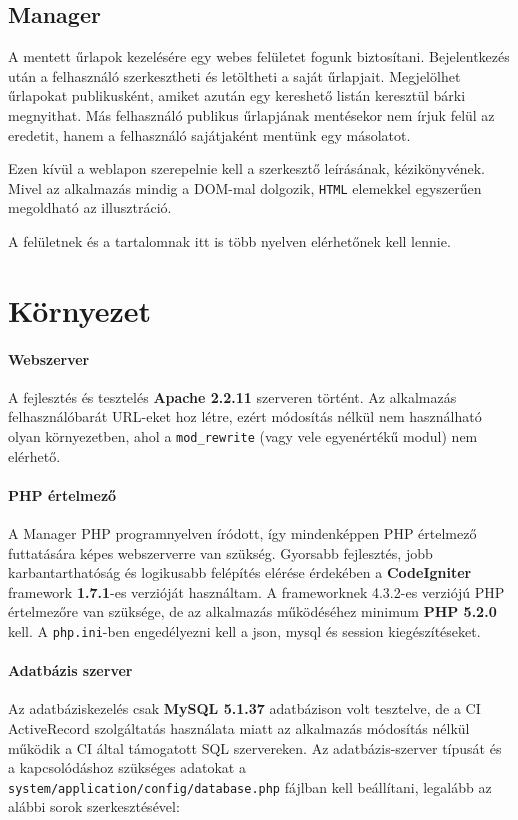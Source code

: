 \documentclass[12pt,a4paper,twoside]{article}
\begin{document}
\subsection{Manager}

A mentett űrlapok kezelésére egy webes felületet fogunk
biztosítani. Bejelentkezés után a felhasználó szerkesztheti és letöltheti a
saját űrlapjait. Megjelölhet űrlapokat publikusként, amiket azután
egy kereshető listán keresztül bárki megnyithat. Más felhasználó publikus
űrlapjának mentésekor nem írjuk felül az eredetit, hanem a felhasználó
sajátjaként mentünk egy másolatot.

Ezen kívül a weblapon szerepelnie kell a szerkesztő leírásának,
kézikönyvének. Mivel az alkalmazás mindig a DOM-mal\cite{DOM} dolgozik,
\texttt{HTML} elemekkel egyszerűen megoldható az illusztráció.

A felületnek és a tartalomnak itt is több nyelven elérhetőnek kell lennie.

\clearpage
{}
\section{Környezet}

\paragraph{Webszerver}
A fejlesztés és tesztelés \textbf{Apache 2.2.11} szerveren történt. Az
alkalmazás felhasználóbarát URL-eket hoz létre, ezért módosítás nélkül nem
használható olyan környezetben, ahol a \texttt{mod\_rewrite} (vagy vele
egyenértékű modul) nem elérhető.

\paragraph{PHP értelmező}
A Manager PHP programnyelven íródott, így mindenképpen PHP értelmező futtatására
képes webszerverre van szükség. Gyorsabb fejlesztés, jobb karbantarthatóság és
logikusabb felépítés elérése érdekében a \textbf{CodeIgniter}\cite{CI} framework
\textbf{1.7.1}-es verzióját használtam. A frameworknek 4.3.2-es verziójú
PHP értelmezőre van szüksége, de az alkalmazás működéséhez minimum \textbf{PHP
  5.2.0} kell. A \texttt{php.ini}-ben engedélyezni kell a json, mysql
és session kiegészítéseket.

\paragraph{Adatbázis szerver}
Az adatbáziskezelés csak \textbf{MySQL 5.1.37} adatbázison volt tesztelve, de a
CI ActiveRecord\cite{CI-ActiveRecord} szolgáltatás használata miatt az
alkalmazás módosítás nélkül működik a CI által támogatott SQL
szervereken\cite{CI-Req}. Az adatbázis-szerver típusát és a kapcsolódáshoz
szükséges adatokat a \texttt{system/application/config/database.php} fájlban
kell beállítani, legalább az alábbi sorok szerkesztésével:
\end{document}
